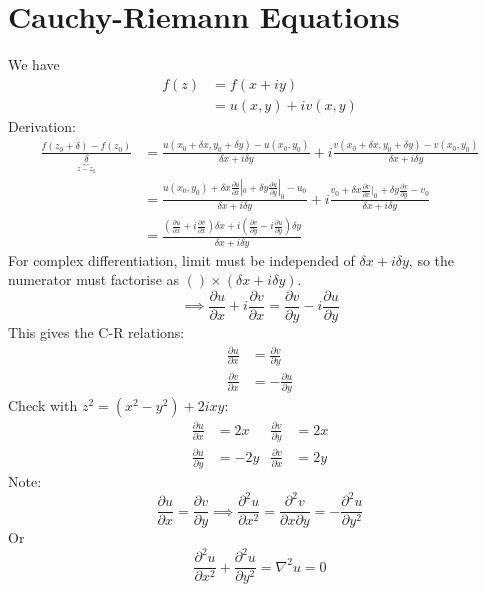 \documentclass[a4paper, 11pt, normalem]{report}
\newcommand\p{\partial}
\newcommand\del{\nabla}
\begin{document}
\section{Cauchy-Riemann Equations}
We have
\begin{align}
    f(z) &= f(x + iy) \\
         &= u(x,y) + iv(x,y)
\end{align}
Derivation:
\begin{align}
    \frac{f(z_0 + \delta) - f(z_0)}{\underbrace{\delta}_{z - z_0}} &= \frac{u(x_0 + \delta x, y_0 + \delta y) - u(x_0,y_0)}{\delta x + i\delta y} + i\frac{v(x_0 + \delta x, y_0 + \delta y) - v(x_0,y_0)}{\delta x + i\delta y} \\
                                                                   &= \frac{u(x_0,y_0) + \delta x \frac{\p u}{\p x}|_0 + \delta y \frac{\p u}{\p y}|_0 - u_0}{\delta x + i\delta y} + i\frac{v_0 + \delta x \frac{\p v}{\p x}|_0 + \delta y\frac{\p v}{\p y} - v_0}{\delta x + i\delta y} \\
                                                                   &= \frac{\left(\frac{\p u}{\p x} + i\frac{\p v}{\p x}\right)\delta x + i\left(\frac{\p v}{\p y} - i\frac{\p u}{\p y}\right)\delta y}{\delta x + i\delta y}
\end{align}
For complex differentiation, limit must be independed of $\delta x + i\delta y$, so the numerator must factorise as $() \times (\delta x + i\delta y)$.
\begin{equation}
    \implies \frac{\p u}{\p x} + i\frac{\p v}{\p x} = \frac{\p v}{\p y} - i\frac{\p u}{\p y}
\end{equation}
This gives the C-R relations:
\begin{align}
    \frac{\p u}{\p x} &= \frac{\p v}{\p y} \\
    \frac{\p v}{\p x} &= -\frac{\p u}{\p y} 
\end{align}
Check with $z^2 = (x^2 - y^2) + 2ixy$:
\begin{align}
    \frac{\p u}{\p x} &= 2x & \frac{\p v}{\p y} &= 2x \\
    \frac{\p u}{\p y} &= -2y & \frac{\p v}{\p x} &= 2y 
\end{align}
Note:
\begin{equation}
    \frac{\p u}{\p x} = \frac{\p v}{\p y} \implies \frac{\p^2 u}{\p x^2} = \frac{\p^2 v}{\p x \p y} = -\frac{\p^2 u}{\p y^2}
\end{equation}
Or 
\begin{equation}
    \frac{\p^2 u}{\p x^2} + \frac{\p^2 u}{\p y^2} = \del^2 u = 0
\end{equation}
\end{document}
